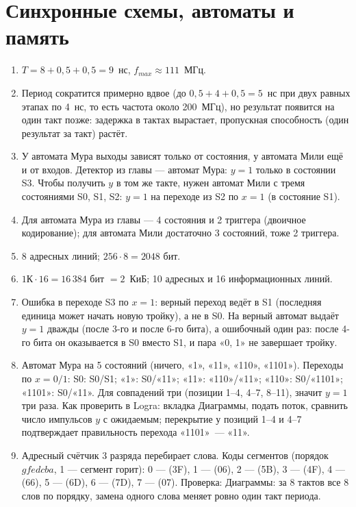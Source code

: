 \section*{Синхронные схемы, автоматы и память}
\begin{enumerate}
  \item {} $T=8+0{,}5+0{,}5=9$~нс, $f_{max}\approx 111$~МГц.
  \item {} Период сократится примерно вдвое (до $0{,}5+4+0{,}5=5$~нс при двух равных этапах по 4~нс, то есть частота около 200~МГц), но результат появится на один такт позже: задержка в тактах вырастает, пропускная способность (один результат за такт) растёт.
  \item {} У автомата Мура выходы зависят только от состояния, у автомата Мили ещё и от входов. Детектор  из главы --- автомат Мура: $y=1$ только в состоянии S3. Чтобы получить $y$ в том же такте, нужен автомат Мили с тремя состояниями S0, S1, S2: $y=1$ на переходе из S2 по $x=1$ (в состояние S1).
  \item {} Для автомата Мура из главы --- 4 состояния и 2 триггера (двоичное кодирование); для автомата Мили достаточно 3 состояний, тоже 2 триггера.
  \item {} 8 адресных линий; $256\cdot 8=2048$ бит.
  \item {} $1\text{К}\cdot 16=16\,384$ бит $=2$~КиБ; 10 адресных и 16 информационных линий.
  \item {} Ошибка в переходе S3 по $x=1$: верный переход ведёт в S1 (последняя единица может начать новую тройку), а не в S0. На  верный автомат выдаёт $y=1$ дважды (после 3-го и после 6-го бита), а ошибочный один раз: после 4-го бита он оказывается в S0 вместо S1, и пара «0, 1» не завершает тройку.
  \item {} Автомат Мура на 5 состояний (ничего, «1», «11», «110», «1101»). Переходы по $x=0/1$: S0: S0/S1; «1»: S0/«11»; «11»: «110»/«11»; «110»: S0/«1101»; «1101»: S0/«11». Для  совпадений три (позиции 1--4, 4--7, 8--11), значит $y=1$ три раза. Как проверить в Logra: вкладка Диаграммы, подать поток, сравнить число импульсов $y$ с ожидаемым; перекрытие у позиций 1--4 и 4--7 подтверждает правильность перехода «1101»~--- «11».
  \item {} Адресный счётчик 3 разряда перебирает слова. Коды сегментов (порядок $gfedcba$, 1 --- сегмент горит): 0 ---  (3F), 1 ---  (06), 2 ---  (5B), 3 ---  (4F), 4 ---  (66), 5 ---  (6D), 6 ---  (7D), 7 ---  (07). Проверка: Диаграммы: за 8 тактов все 8 слов по порядку, замена одного слова меняет ровно один такт периода.
\end{enumerate}

